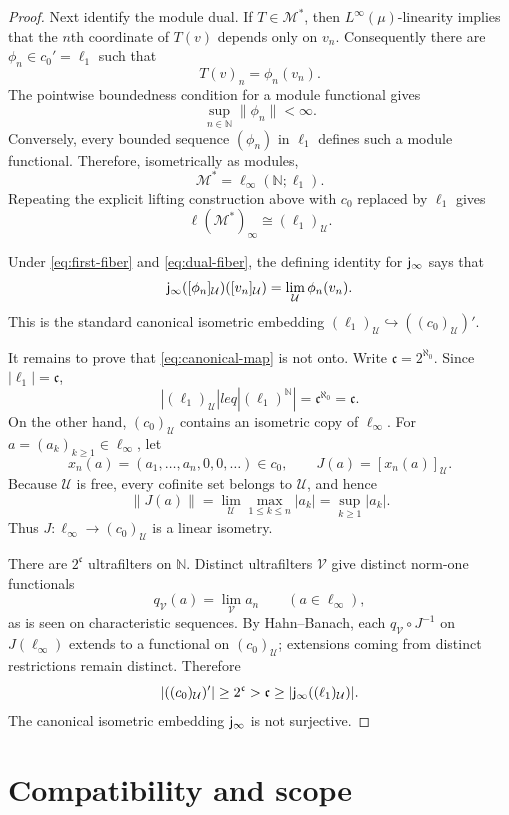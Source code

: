 \documentclass[11pt]{amsart}
\newcommand{\N}{\mathbb N}
\newcommand{\U}{\mathcal U}
\begin{document}
\begin{proof}
Next identify the module dual.  If $T\in\mathscr M^*$, then
$L^\infty(\mu)$-linearity implies that the $n$th coordinate of $T(v)$ depends
only on $v_n$.  Consequently there are $\phi_n\in c_0'=\ell_1$ such that
\[
  T(v)_n=\phi_n(v_n).
\]
The pointwise boundedness condition for a module functional gives
\[
  \sup_{n\in\N}\|\phi_n\|<\infty.
\]
Conversely, every bounded sequence
$(\phi_n)$ in $\ell_1$ defines such a module functional.  Therefore,
isometrically as modules,
\[
  \mathscr M^*=\ell_\infty(\N;\ell_1).
\]
Repeating the explicit lifting construction above with $c_0$ replaced by
$\ell_1$ gives
\begin{equation}\label{eq:dual-fiber}
  \ell(\mathscr M^*)_\infty\cong(\ell_1)_\U.
\end{equation}

Under \eqref{eq:first-fiber} and \eqref{eq:dual-fiber}, the defining identity
for ${\sf j}_\infty$ says that
\begin{equation}\label{eq:canonical-map}
 {\sf j}_\infty([\phi_n]_\U)([v_n]_\U)
   =\lim_\U\phi_n(v_n).
\end{equation}
This is the standard canonical isometric embedding
$(\ell_1)_\U\hookrightarrow((c_0)_\U)'$.

It remains to prove that \eqref{eq:canonical-map} is not onto.  Write
$\mathfrak c=2^{\aleph_0}$.  Since $|\ell_1|=\mathfrak c$,
\[
  |(\ell_1)_\U|leq |(\ell_1)^\N|
  =\mathfrak c^{\aleph_0}=\mathfrak c.
\]
On the other hand, $(c_0)_\U$ contains an isometric copy of $\ell_\infty$.
For $a=(a_k)_{k\geq1}\in\ell_\infty$, let
\[
  x_n(a)=(a_1,\ldots,a_n,0,0,\ldots)\in c_0,
  \qquad J(a)=[x_n(a)]_\U.
\]
Because $\U$ is free, every cofinite set belongs to $\U$, and hence
\[
 \|J(a)\|
 =\lim_\U\max_{1\leq k\leq n}|a_k|
 =\sup_{k\geq1}|a_k|.
\]
Thus $J:\ell_\infty\to(c_0)_\U$ is a linear isometry.

There are $2^{\mathfrak c}$ ultrafilters on $\N$.  Distinct ultrafilters
$\mathcal V$ give distinct norm-one functionals
\[
  q_{\mathcal V}(a)=\lim_{\mathcal V}a_n
  \qquad(a\in\ell_\infty),
\]
as is seen on characteristic sequences.  By Hahn--Banach, each
$q_{\mathcal V}\circ J^{-1}$ on $J(\ell_\infty)$ extends to a functional on
$(c_0)_\U$; extensions coming from distinct restrictions remain distinct.
Therefore
\[
  |((c_0)_\U)'|\geq2^{\mathfrak c}
  >\mathfrak c\geq|{\sf j}_\infty((\ell_1)_\U)|.
\]
The canonical isometric embedding ${\sf j}_\infty$ is not surjective.
\end{proof}

\section*{Compatibility and scope}
\end{document}
